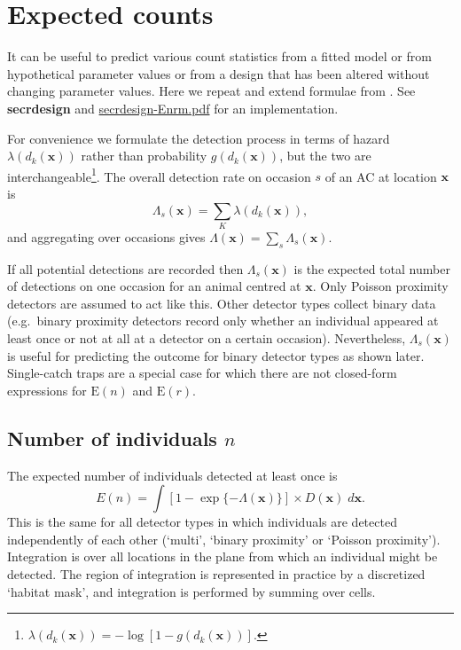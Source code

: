 \documentclass[
]{book}
\begin{document}
\chapter{Expected counts}\label{Expected}

It can be useful to predict various count statistics from a fitted model or from hypothetical parameter values or from a design that has been altered without changing parameter values. Here we repeat and extend formulae from \citet{eb19}. See \textbf{secrdesign} and \href{https://www.otago.ac.nz/density/pdfs/secrdesign-Enrm.pdf}{secrdesign-Enrm.pdf} for an implementation.

For convenience we formulate the detection process in terms of hazard \(\lambda(d_k(\mathbf{x}))\) rather than probability \(g(d_k(\mathbf{x}))\), but the two are interchangeable\footnote{\(\lambda(d_k(\mathbf{x})) = -\log[1 - g(d_k(\mathbf{x}))]\).}. The overall detection rate on occasion \(s\) of an AC at location \(\mathbf{x}\) is
\begin{equation}
 \Lambda_s(\mathbf{x}) = \sum_K \lambda(d_k(\mathbf{x})),
\end{equation}
and aggregating over occasions gives \(\Lambda(\mathbf{x}) = \sum_s \Lambda_s(\mathbf{x})\).

If all potential detections are recorded then \(\Lambda_s(\mathbf{x})\) is the expected total number of detections on one occasion for an animal centred at \(\mathbf{x}\). Only Poisson proximity detectors are assumed to act like this. Other detector types collect binary data (e.g.~binary proximity detectors record only whether an individual appeared at least once or not at all at a detector on a certain occasion). Nevertheless, \(\Lambda_s(\mathbf{x})\) is useful for predicting the outcome for binary detector types as shown later. Single-catch traps are a special case for which there are not closed-form expressions for \(\mbox{E} (n)\) and \(\mbox{E} (r)\).

\section{\texorpdfstring{Number of individuals \(n\)}{Number of individuals n}}\label{number-of-individuals-n}

The expected number of individuals detected at least once is \[E(n) = \int [1 - \exp\{-\Lambda(\mathbf{x}) \} ] \times  D(\mathbf{x}) \; d \mathbf{x}.\] This is the same for all detector types in which individuals are detected independently of each other (`multi', `binary proximity' or `Poisson proximity'). Integration is over all locations in the plane from which an individual might be detected. The region of integration is represented in practice by a discretized `habitat mask', and integration is performed by summing over cells.
\end{document}
